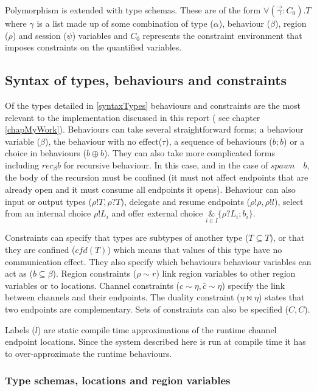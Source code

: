 Polymorphism is extended with type schemas. These are of the form $\forall(\overrightarrow{\gamma}:C_0).T$ where $\gamma$ is a list made up of some combination of type ($\alpha$), behaviour ($\beta$), region ($\rho$) and session ($\psi$) variables and $C_0$ represents the constraint environment that imposes constraints on the quantified variables. 

\subsection{Syntax of types, behaviours and constraints}

Of the types detailed in \ref{syntaxTypes} behaviours and constraints are the most relevant to the implementation discussed in this report ( see chapter \ref{chapMyWork}). Behaviours can take several straightforward forms; a behaviour variable ($\beta$), the behaviour with no effect($\tau$), a sequence of behaviours ($b;b$) or a choice in behaviours ($b \oplus b$). They can also take more complicated forms including $rec_\beta b$ for recursive behaviour. In this case, and in the case of $spawn \quad b$, the body of the recursion must be confined (it must not affect endpoints that are already open and it must consume all endpoints it opens). Behaviour can also input or output types ($\rho!T, \rho?T$), delegate and resume endpoints ($\rho!\rho, \rho!l$), select from an internal choice $\rho ! L_i$ and offer external choice $\underset{i \in I}{\&}\{\rho?L_i ; b_i\}$.

Constraints can specify that types are subtypes of another type ($T\subseteq T$), or that they are confined ($cfd(T)$) which means that values of this type have no communication effect. They also specify which behaviours behaviour variables can act as ($b\subseteq \beta$). Region constraints ($\rho \sim r$) link region variables to other region variables or to locations. Channel constraints ($c\sim\eta, \bar{c}\sim\eta$) specify the link between channels and their endpoints. The duality constraint ($\eta \bowtie \eta$) states that two endpoints are complementary. Sets of constraints can also be specified ($C,C$). 

Labels ($l$) are static compile time approximations of the runtime channel endpoint locations. Since the system described here is run at compile time it has to over-approximate the runtime behaviours. 


\subsubsection{Type schemas, locations and region variables} 
\label{secTs}

